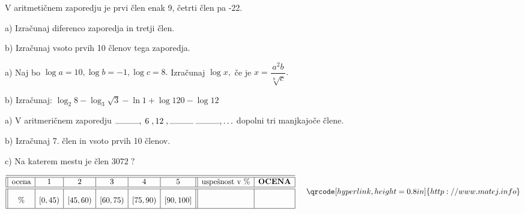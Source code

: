 \documentclass[a4paper,12pt]{letter}
\newcounter{tocke}
\begin{document}


\newpage
\def\tocke6{4+4}
\begin{naloga}[\hfill \quad $\tocke6$
\qquad \rightsquigarrow \vert a.\qquad| b.\qquad| c.\qquad| ] \addtocounter{tocke}{\tocke6}
V aritmetičnem zaporedju je prvi člen enak 9, četrti člen pa -22. 

a) Izračunaj diferenco zaporedja in tretji člen.

b) Izračunaj vsoto prvih 10 členov tega zaporedja.
\end{naloga}

\vspace{10cm}
\def\tocke6{4+3}
\begin{naloga}[\hfill \quad $\tocke6$
\qquad \rightsquigarrow \vert a.\qquad| b.\qquad| c.\qquad| ] \addtocounter{tocke}{\tocke6}
a) Naj bo $\log a=10, \log b=-1,\log c=8.$ Izračunaj $\log x,$ če je $x=\dfrac{a^2b}{\sqrt[8]{c}}.$

b) Izračunaj: $\log_2 8-\log_3 \sqrt{3}-\ln 1+\log 120-\log 12$
\end{naloga}
 



\newpage
\def\tocke3{3+4+3}
\begin{naloga}[\hfill \quad $\tocke3$
\qquad \rightsquigarrow \vert a.\qquad\vert b.\qquad] \addtocounter{tocke}{\tocke3}
a) V aritmeričnem zaporedju $\rule{1cm}{0.1mm},\;6\;,12\;,\rule{1cm}{0.1mm}\;\rule{1cm}{0.1mm}, \ldots$ dopolni tri manjkajoče člene.

b) Izračunaj 7. člen in vsoto prvih 10 členov.

c) Na katerem mestu je člen $3072\;?$
\end{naloga}



\vfill
{}
\begin{kriterij*}
 $$
 \begin{array}{||c|c|c|c|c|c||
>{}c|c|}
 \hline\hline
 \textup{ocena}& 1&2&3&4&5&\textrm{uspe\v{s}nost v } \%& \textrm{\bf OCENA}\\
  \hline\hline
 \% & [0,45) &[45,60)&[60,75
 ) &[75,90)    &    [90,100]& \mbox{\phantom{ \huge{$\frac{5}{445}$
 15}}
 } 
 & \\
 \hline
 \end{array} \hspace*{0.5cm}\vspace*{-0.3cm} \qrcode[hyperlink,height=0.8in]{http://www.matej.info}
$$
\vspace*{0.1cm}
\end{kriterij*}
\end{document}
